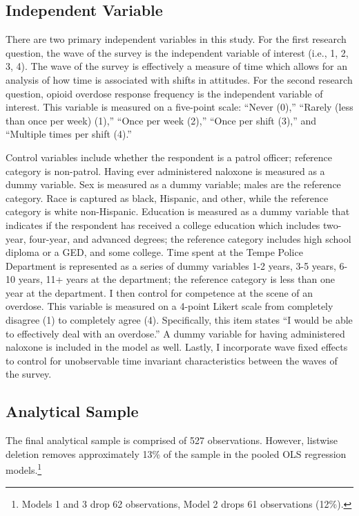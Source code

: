 \subsection{Independent Variable}

There are two primary independent variables in this study. For the first research question, the wave of the survey is the independent variable of interest (i.e., 1, 2, 3, 4). The wave of the survey is effectively a measure of time which allows for an analysis of how time is associated with shifts in attitudes. For the second research question, opioid overdose response frequency is the independent variable of interest. This variable is measured on a five-point scale: “Never (0),” “Rarely (less than once per week) (1),” “Once per week (2),” “Once per shift (3),” and “Multiple times per shift (4).”

Control variables include whether the respondent is a patrol officer; reference category is non-patrol. Having ever administered naloxone is measured as a dummy variable. Sex is measured as a dummy variable; males are the reference category. Race is captured as black, Hispanic, and other, while the reference category is white non-Hispanic. Education is measured as a dummy variable that indicates if the respondent has received a college education which includes two-year, four-year, and advanced degrees; the reference category includes high school diploma or a GED, and some college. Time spent at the Tempe Police Department is represented as a series of dummy variables 1-2 years, 3-5 years, 6-10 years, 11+ years at the department; the reference category is less than one year at the department. I then control for competence at the scene of an overdose. This variable is measured on a 4-point Likert scale from completely disagree (1) to completely agree (4). Specifically, this item states “I would be able to effectively deal with an overdose.” A dummy variable for having administered naloxone is included in the model as well. Lastly, I incorporate wave fixed effects to control for unobservable time invariant characteristics between the waves of the survey.

\subsection{Analytical Sample}

The final analytical sample is comprised of 527 observations. However, listwise deletion removes approximately 13\% of the sample in the pooled OLS regression models.\footnote{Models 1 and 3 drop 62 observations, Model 2 drops 61 observations (12\%).} 


